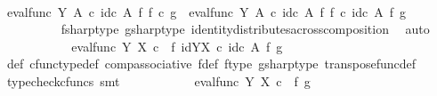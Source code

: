 \begin{isabellebody}
\ \ \ \ \isamarkupfalse%
\ {\isacharminus}{\kern0pt}\ \isanewline
\ \ \ \ \ \ \isamarkupfalse%
\ {\isachardoublequoteopen}eval{\isacharunderscore}{\kern0pt}func\ Y\ A\ {\isasymcirc}\isactrlsub c\ id\isactrlsub c\ A\ {\isasymtimes}\isactrlsub f\ f\isactrlsup {\isasymsharp}\ {\isasymcirc}\isactrlsub c\ g\isactrlsup {\isasymsharp}\ {\isacharequal}{\kern0pt}\ eval{\isacharunderscore}{\kern0pt}func\ Y\ A\ {\isasymcirc}\isactrlsub c\ {\isacharparenleft}{\kern0pt}id\isactrlsub c\ A\ {\isasymtimes}\isactrlsub f\ f\isactrlsup {\isasymsharp}{\isacharparenright}{\kern0pt}\ {\isasymcirc}\isactrlsub c\ {\isacharparenleft}{\kern0pt}id\isactrlsub c\ A\ {\isasymtimes}\isactrlsub f\ g\isactrlsup {\isasymsharp}{\isacharparenright}{\kern0pt}{\isachardoublequoteclose}\isanewline
\ \ \ \ \ \ \ \ \isamarkupfalse%
\ fsharp{\isacharunderscore}{\kern0pt}type\ gsharp{\isacharunderscore}{\kern0pt}type\ identity{\isacharunderscore}{\kern0pt}distributes{\isacharunderscore}{\kern0pt}across{\isacharunderscore}{\kern0pt}composition\ \isamarkupfalse%
\ auto\isanewline
\ \ \ \ \ \ \isamarkupfalse%
\ \isamarkupfalse%
\ {\isachardoublequoteopen}{\isachardot}{\kern0pt}{\isachardot}{\kern0pt}{\isachardot}{\kern0pt}\ {\isacharequal}{\kern0pt}\ eval{\isacharunderscore}{\kern0pt}func\ Y\ X\ {\isasymcirc}\isactrlsub c\ {\isacharparenleft}{\kern0pt}{\isasympsi}\ {\isasymtimes}\isactrlsub f\ id{\isacharparenleft}{\kern0pt}Y\isactrlbsup X\isactrlesup {\isacharparenright}{\kern0pt}{\isacharparenright}{\kern0pt}\ {\isasymcirc}\isactrlsub c\ {\isacharparenleft}{\kern0pt}id\isactrlsub c\ A\ {\isasymtimes}\isactrlsub f\ g\isactrlsup {\isasymsharp}{\isacharparenright}{\kern0pt}{\isachardoublequoteclose}\isanewline
\ \ \ \ \ \ \ \ \isamarkupfalse%
\ {\isasympsi}{\isacharunderscore}{\kern0pt}def\ cfunc{\isacharunderscore}{\kern0pt}type{\isacharunderscore}{\kern0pt}def\ comp{\isacharunderscore}{\kern0pt}associative\ f{\isacharunderscore}{\kern0pt}def\ f{\isacharunderscore}{\kern0pt}type\ gsharp{\isacharunderscore}{\kern0pt}type\ transpose{\isacharunderscore}{\kern0pt}func{\isacharunderscore}{\kern0pt}def\ \isamarkupfalse%
\ {\isacharparenleft}{\kern0pt}typecheck{\isacharunderscore}{\kern0pt}cfuncs{\isacharcomma}{\kern0pt}\ smt{\isacharparenright}{\kern0pt}\isanewline
\ \ \ \ \ \ \isamarkupfalse%
\ \isamarkupfalse%
\ {\isachardoublequoteopen}{\isachardot}{\kern0pt}{\isachardot}{\kern0pt}{\isachardot}{\kern0pt}\ {\isacharequal}{\kern0pt}\ eval{\isacharunderscore}{\kern0pt}func\ Y\ X\ {\isasymcirc}\isactrlsub c\ {\isacharparenleft}{\kern0pt}{\isasympsi}\ {\isasymtimes}\isactrlsub f\ g\isactrlsup {\isasymsharp}{\isacharparenright}{\kern0pt}{\isachardoublequoteclose}\isanewline

\end{isabellebody}
